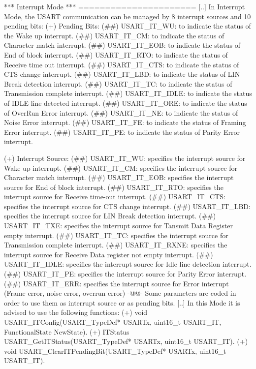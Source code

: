 \begin{DoxyVerb}
 *** Interrupt Mode ***
 ======================
    [..] In Interrupt Mode, the USART communication can be managed by 8 interrupt 
         sources and 10 pending bits:
         (+) Pending Bits:
             (##) USART_IT_WU: to indicate the status of the Wake up interrupt.
             (##) USART_IT_CM: to indicate the status of Character match interrupt.
             (##) USART_IT_EOB: to indicate the status of End of block interrupt.
             (##) USART_IT_RTO: to indicate the status of Receive time out interrupt.
             (##) USART_IT_CTS: to indicate the status of CTS change interrupt.
             (##) USART_IT_LBD: to indicate the status of LIN Break detection interrupt.
             (##) USART_IT_TC: to indicate the status of Transmission complete interrupt.
             (##) USART_IT_IDLE: to indicate the status of IDLE line detected interrupt.
             (##) USART_IT_ORE: to indicate the status of OverRun Error interrupt.
             (##) USART_IT_NE: to indicate the status of Noise Error interrupt.
             (##) USART_IT_FE: to indicate the status of Framing Error interrupt.
             (##) USART_IT_PE: to indicate the status of Parity Error interrupt.  
              
         (+) Interrupt Source:
             (##) USART_IT_WU: specifies the interrupt source for Wake up interrupt.
             (##) USART_IT_CM: specifies the interrupt source for Character match 
                  interrupt.
             (##) USART_IT_EOB: specifies the interrupt source for End of block
                  interrupt.
             (##) USART_IT_RTO: specifies the interrupt source for Receive time-out
                  interrupt.
             (##) USART_IT_CTS: specifies the interrupt source for CTS change interrupt.
             (##) USART_IT_LBD: specifies the interrupt source for LIN Break 
                  detection interrupt.
             (##) USART_IT_TXE: specifies the interrupt source for Tansmit Data 
                  Register empty interrupt.
             (##) USART_IT_TC: specifies the interrupt source for Transmission 
                  complete interrupt.
             (##) USART_IT_RXNE: specifies the interrupt source for Receive Data 
                  register not empty interrupt.
             (##) USART_IT_IDLE: specifies the interrupt source for Idle line 
                  detection interrupt.
             (##) USART_IT_PE: specifies the interrupt source for Parity Error interrupt.
             (##) USART_IT_ERR: specifies the interrupt source for Error interrupt
                  (Frame error, noise error, overrun error)
             -@@- Some parameters are coded in order to use them as interrupt 
                 source or as pending bits.
    [..] In this Mode it is advised to use the following functions:
         (+) void USART_ITConfig(USART_TypeDef* USARTx, uint16_t USART_IT, FunctionalState NewState).
         (+) ITStatus USART_GetITStatus(USART_TypeDef* USARTx, uint16_t USART_IT).
         (+) void USART_ClearITPendingBit(USART_TypeDef* USARTx, uint16_t USART_IT).\end{DoxyVerb}
 

